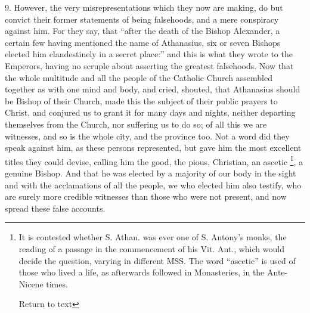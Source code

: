 9. However, the very misrepresentations which
they now are making, do but convict their former statements of being
falsehoods, and a mere conspiracy against him. For they say, that ``after
the death of the Bishop Alexander, a certain few having mentioned the
name of Athanasius, six or seven Bishops elected him clandestinely in
a secret place:'' and this is what they wrote to the Emperors, having
no scruple about asserting the greatest falsehoods. Now that the whole
multitude and all the people of the Catholic Church assembled together
as with one mind and body, and cried, shouted, that Athanasius should
be Bishop of their Church, made this the subject of their public
prayers to Christ, and conjured us to grant it for many days and
nights, neither departing themselves from the Church, nor suffering us
to do so; of all this we are witnesses, and so is the whole city, and
the province too. Not a word did they speak against him, as these
persons represented, but gave him the most excellent titles they could
devise, calling him the good, the pious, Christian, an ascetic \footnote{It is contested whether S. Athan. was ever one of S. Antony's monks,
the reading of a passage in the commencement of his Vit. Ant., which
would decide the question, varying in different MSS. The word ``ascetic''
is used of those who lived a life, as afterwards followed in
Monasteries, in the Ante-Nicene times.

Return to text}, a genuine Bishop. And that he was elected by a majority of our
body in the sight and with the acclamations of all the people, we who
elected him also testify, who are surely more credible witnesses than
those who were not present, and now spread these false accounts.

